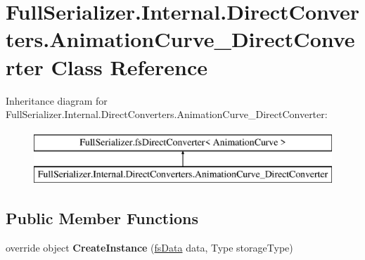 \hypertarget{class_full_serializer_1_1_internal_1_1_direct_converters_1_1_animation_curve___direct_converter}{}\section{Full\+Serializer.\+Internal.\+Direct\+Converters.\+Animation\+Curve\+\_\+\+Direct\+Converter Class Reference}
\label{class_full_serializer_1_1_internal_1_1_direct_converters_1_1_animation_curve___direct_converter}
Inheritance diagram for Full\+Serializer.\+Internal.\+Direct\+Converters.\+Animation\+Curve\+\_\+\+Direct\+Converter\+:\begin{figure}[H]
\begin{center}
\leavevmode
\includegraphics[height=2.000000cm]{class_full_serializer_1_1_internal_1_1_direct_converters_1_1_animation_curve___direct_converter}
\end{center}
\end{figure}
\subsection*{Public Member Functions}
\begin{DoxyCompactItemize}
\item 
\mbox{\label{class_full_serializer_1_1_internal_1_1_direct_converters_1_1_animation_curve___direct_converter_ade5d37cdc1d926982bc5523d3745cfb7}} 
override object {\bfseries Create\+Instance} (\hyperlink{class_full_serializer_1_1fs_data}{fs\+Data} data, Type storage\+Type)
\end{DoxyCompactItemize}
